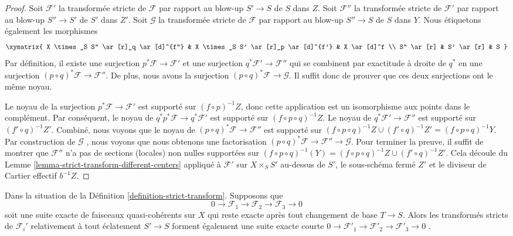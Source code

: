 \begin{proof}
Soit  $\mathcal{F}'$  la transformée stricte de  $\mathcal{F}$  par rapport au blow-up
 $S' \to S$  de  $S$  dans  $Z$. Soit  $\mathcal{F}''$  la transformée
stricte de  $\mathcal{F}'$  par rapport au blow-up  $S'' \to S'$  de  $S'$  dans
 $Z'$. Soit  $\mathcal{G}$  la transformée stricte de  $\mathcal{F}$  par rapport
au blow-up  $S'' \to S$  de  $S$  dans  $Y$. Nous étiquetons
également les morphismes
$$
\xymatrix{
X \times_S S'' \ar[r]_q \ar[d]^{f''} &
X \times_S S' \ar[r]_p \ar[d]^{f'} &
X \ar[d]^f \\
S'' \ar[r] & S' \ar[r] & S
}
$$
Par définition, il existe une surjection  $p^*\mathcal{F} \to \mathcal{F}'$  et une surjection
 $q^*\mathcal{F}' \to \mathcal{F}''$  qui se combinent par exactitude à droite de  $q^*$  en une
surjection  $(p \circ q)^*\mathcal{F} \to \mathcal{F}''$. De plus, nous avons la surjection  $(p \circ q)^*\mathcal{F} \to \mathcal{G}$. Il suffit
donc de prouver que ces deux surjections ont le même noyau.

\medskip\noindent
Le noyau de la surjection  $p^*\mathcal{F} \to \mathcal{F}'$  est supporté sur  $(f \circ p)^{-1}Z$, donc cette
application est un isomorphisme aux points dans le complément. Par conséquent, le
noyau de  $q^*p^*\mathcal{F} \to q^*\mathcal{F}'$  est supporté sur  $(f \circ p \circ q)^{-1}Z$. Le noyau de  $q^*\mathcal{F}' \to \mathcal{F}''$  est
supporté sur  $(f' \circ q)^{-1}Z'$. Combiné, nous voyons que le noyau de  $(p \circ q)^*\mathcal{F} \to \mathcal{F}''$  est
supporté sur  $(f \circ p \circ q)^{-1}Z \cup (f' \circ q)^{-1}Z' =
(f \circ p \circ q)^{-1}Y$. Par construction de  $\mathcal{G}$ , nous voyons que nous
obtenons une factorisation  $(p \circ q)^*\mathcal{F} \to \mathcal{F}'' \to \mathcal{G}$. Pour terminer la preuve, il suffit de
montrer que  $\mathcal{F}''$  n’a pas de sections (locales) non nulles supportées sur
 $(f \circ p \circ q)^{-1}(Y) =
(f \circ p \circ q)^{-1}Z \cup (f' \circ q)^{-1}Z'$. Cela découle du Lemme  \ref{lemma-strict-transform-different-centers}  appliqué à  $\mathcal{F}'$  sur
 $X \times_S S'$  au-dessus de  $S'$, le sous-schéma fermé  $Z'$  et le
diviseur de Cartier effectif  $b^{-1}Z$.
\end{proof}

\begin{lemma}
\label{lemma-strict-transform-universally-injective}
Dans la situation de la Définition  \ref{definition-strict-transform}. Supposons que
$$
0 \to \mathcal{F}_1 \to \mathcal{F}_2 \to \mathcal{F}_3 \to 0
$$
soit une suite exacte de faisceaux quasi-cohérents sur  $X$  qui reste
exacte après tout changement de base  $T \to S$. Alors les transformés stricts
de  $\mathcal{F}_i'$  relativement à tout éclatement  $S' \to S$  forment également une
suite exacte courte  $0 \to \mathcal{F}'_1 \to \mathcal{F}'_2 \to \mathcal{F}'_3 \to 0$ .
\end{lemma}

